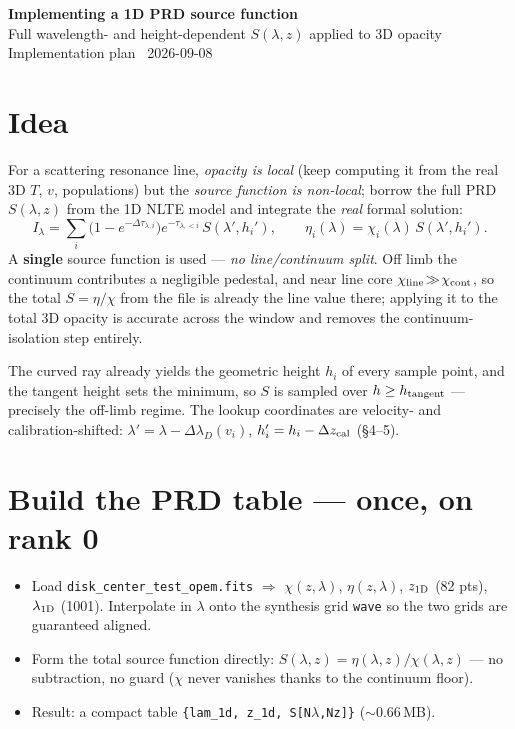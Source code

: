 \documentclass[10pt]{article}
\newcommand{\code}[1]{\texttt{\small #1}}
\begin{document}
\begin{center}
  {\LARGE\bfseries Implementing a 1D PRD source function}\\[2pt]
  {\large\color{accent} Full wavelength- and height-dependent $S(\lambda,z)$ applied to 3D opacity}\\[2pt]
  {\small Implementation plan \textperiodcentered\ 2026-09-08}
\end{center}

\section{Idea}
For a scattering resonance line, \emph{opacity is local} (keep computing it from
the real 3D $T$, $v$, populations) but the \emph{source function is non-local};
borrow the full PRD $S(\lambda,z)$ from the 1D NLTE model and integrate the
\emph{real} formal solution:
\[
  I_\lambda=\sum_i\bigl(1-e^{-\Delta\tau_{\lambda,i}}\bigr)e^{-\tau_{\lambda,<i}}\,
  S(\lambda',h_i'),\qquad
  \eta_i(\lambda)=\chi_i(\lambda)\,S(\lambda',h_i').
\]
A \textbf{single} source function is used --- \emph{no line/continuum split}. Off
limb the continuum contributes a negligible pedestal, and near line core
$\chi_{\rm line}\!\gg\!\chi_{\rm cont}$, so the total $S=\eta/\chi$ from the file is
already the line value there; applying it to the total 3D opacity is accurate
across the window and removes the continuum-isolation step entirely.

The curved ray already yields the geometric height $h_i$ of every sample point,
and the tangent height sets the minimum, so $S$ is sampled over $h\ge
h_{\rm tangent}$ --- precisely the off-limb regime. The lookup coordinates are
velocity- and calibration-shifted: $\lambda'=\lambda-\Delta\lambda_D(v_i)$,
$h_i'=h_i-\Delta z_{\rm cal}$ (\S4--5).

\section{Build the PRD table --- once, on rank 0}
\begin{itemize}
  \item Load \code{disk\_center\_test\_opem.fits} $\Rightarrow$ $\chi(z,\lambda)$,
    $\eta(z,\lambda)$, $z_{\rm 1D}$ (82 pts), $\lambda_{\rm 1D}$ (1001).
    Interpolate in $\lambda$ onto the synthesis grid \code{wave} so the two grids
    are guaranteed aligned.
  \item Form the total source function directly:
    $S(\lambda,z)=\eta(\lambda,z)/\chi(\lambda,z)$ --- no subtraction, no guard
    ($\chi$ never vanishes thanks to the continuum floor).
  \item Result: a compact table \code{\{lam\_1d, z\_1d, S[N$\lambda$,Nz]\}}
    ($\sim$0.66\,MB).
\end{itemize}
\end{document}

